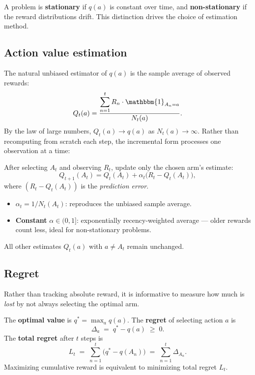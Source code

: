 \documentclass[11pt, oneside]{book}
\newcommand{\ind}{\mathbbm{1}}
\begin{document}
A problem is \textbf{stationary} if $q(a)$ is constant over time, and
\textbf{non-stationary} if the reward distributions drift.
This distinction drives the choice of estimation method.

\subsection{Action value estimation}

The natural unbiased estimator of $q(a)$ is the sample average of observed rewards:
\[
  Q_t(a) = \frac{\displaystyle\sum_{n=1}^{t} R_n \cdot \ind_{A_n = a}}{N_t(a)}.
\]
By the law of large numbers, $Q_t(a) \to q(a)$ as $N_t(a) \to \infty$.
Rather than recomputing from scratch each step, the incremental form processes one
observation at a time:

\begin{thmbox}[title={Incremental Update}]
After selecting $A_t$ and observing $R_t$, update only the chosen arm's estimate:
\[
  Q_{t+1}(A_t) = Q_t(A_t) + \alpha_t\bigl(R_t - Q_t(A_t)\bigr),
\]
where $(R_t - Q_t(A_t))$ is the \emph{prediction error}.
\begin{itemize}
  \item $\alpha_t = 1/N_t(A_t)$: reproduces the unbiased sample average.
  \item \textbf{Constant} $\alpha \in (0,1]$: exponentially recency-weighted average
    --- older rewards count less, ideal for non-stationary problems.
\end{itemize}
All other estimates $Q_t(a)$ with $a \ne A_t$ remain unchanged.
\end{thmbox}

\subsection{Regret}

Rather than tracking absolute reward, it is informative to measure how much is
\emph{lost} by not always selecting the optimal arm.

\begin{defbox}[title={Regret}]
The \textbf{optimal value} is $q^* = \max_a q(a)$.
The \textbf{regret} of selecting action $a$ is
\[
  \Delta_a \;=\; q^* - q(a) \;\ge\; 0.
\]
The \textbf{total regret} after $t$ steps is
\[
  L_t \;=\; \sum_{n=1}^{t} \bigl(q^* - q(A_n)\bigr) \;=\; \sum_{n=1}^{t} \Delta_{A_n}.
\]
Maximizing cumulative reward is equivalent to minimizing total regret $L_t$.
\end{defbox}
\end{document}
